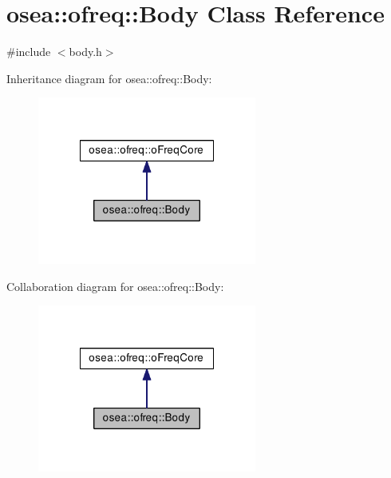 \hypertarget{classosea_1_1ofreq_1_1_body}{\section{osea\-:\-:ofreq\-:\-:Body Class Reference}
\label{classosea_1_1ofreq_1_1_body}
}


{\ttfamily \#include $<$body.\-h$>$}



Inheritance diagram for osea\-:\-:ofreq\-:\-:Body\-:
\nopagebreak
\begin{figure}[H]
\begin{center}
\leavevmode
\includegraphics[width=204pt]{classosea_1_1ofreq_1_1_body__inherit__graph}
\end{center}
\end{figure}


Collaboration diagram for osea\-:\-:ofreq\-:\-:Body\-:
\nopagebreak
\begin{figure}[H]
\begin{center}
\leavevmode
\includegraphics[width=204pt]{classosea_1_1ofreq_1_1_body__coll__graph}
\end{center}
\end{figure}
